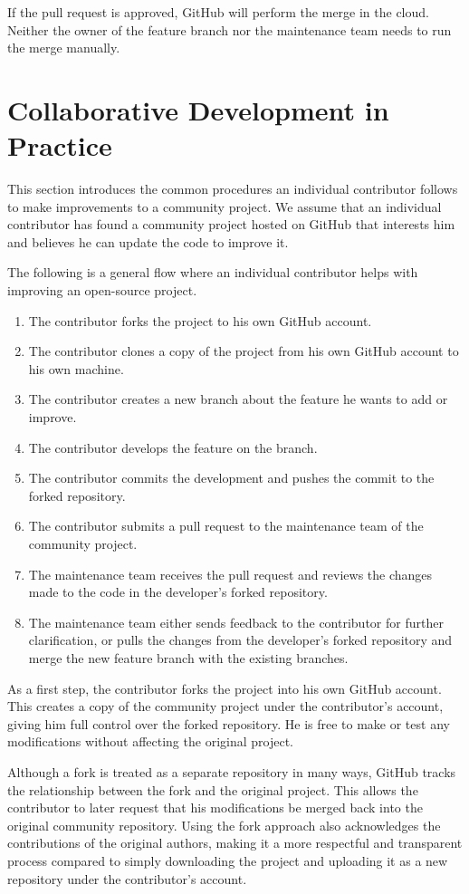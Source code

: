 If the pull request is approved, GitHub will perform the merge in the cloud. Neither the owner of the feature branch nor the maintenance team needs to run the merge manually.

\section{Collaborative Development in Practice}

This section introduces the common procedures an individual contributor follows to make improvements to a community project. We assume that an individual contributor has found a community project hosted on GitHub that interests him and believes he can update the code to improve it.

The following is a general flow where an individual contributor helps with improving an open-source project.
\begin{enumerate}
	\item The contributor forks the project to his own GitHub account.
	\item The contributor clones a copy of the project from his own GitHub account to his own machine.
	\item The contributor creates a new branch about the feature he wants to add or improve.
	\item The contributor develops the feature on the branch.
	\item The contributor commits the development and pushes the commit to the forked repository.
	\item The contributor submits a pull request to the maintenance team of the community project.
	\item The maintenance team receives the pull request and reviews the changes made to the code in the developer's forked repository.
	\item The maintenance team either sends feedback to the contributor for further clarification, or pulls the changes from the developer's forked repository and merge the new feature branch with the existing branches.
\end{enumerate}

As a first step, the contributor forks the project into his own GitHub account. This creates a copy of the community project under the contributor’s account, giving him full control over the forked repository. He is free to make or test any modifications without affecting the original project.

Although a fork is treated as a separate repository in many ways, GitHub tracks the relationship between the fork and the original project. This allows the contributor to later request that his modifications be merged back into the original community repository. Using the fork approach also acknowledges the contributions of the original authors, making it a more respectful and transparent process compared to simply downloading the project and uploading it as a new repository under the contributor's account.


